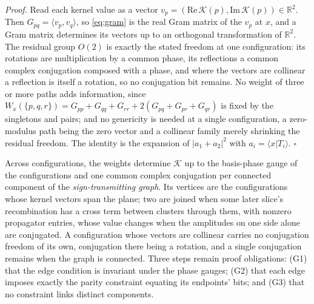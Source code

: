 \noindent\textit{Proof.} Read each kernel value as a vector $v_p = (\mathrm{Re}\,\mathcal{K}(p), \mathrm{Im}\,\mathcal{K}(p)) \in \mathbb{R}^2$. Then $G_{pq} = \langle v_p, v_q\rangle$, so \eqref{eq:gram} is the real Gram matrix of the $v_p$ at $x$, and a Gram matrix determines its vectors up to an orthogonal transformation of $\mathbb{R}^2$. The residual group $O(2)$ is exactly the stated freedom at one configuration: its rotations are multiplication by a common phase, its reflections a common complex conjugation composed with a phase, and where the vectors are collinear a reflection is itself a rotation, so no conjugation bit remains.  No weight of three or more paths adds information, since $W_x(\{p,q,r\}) = G_{pp} + G_{qq} + G_{rr} + 2(G_{pq} + G_{pr} + G_{qr})$ is fixed by the singletons and pairs; and no genericity is needed at a single configuration, a zero-modulus path being the zero vector and a collinear family merely shrinking the residual freedom.  The identity is the expansion of $|a_1 + a_2|^2$ with $a_i = \langle x|T_i\rangle$. \hfill$\square$


\begin{claim}\label{claim:global-polarization}
Across configurations, the weights determine $\mathcal{K}$ up to the basis-phase gauge of the configurations and one common complex conjugation per connected component of the \emph{sign-transmitting graph}. Its vertices are the configurations whose kernel vectors span the plane; two are joined when some later slice's recombination has a cross term between clusters through them, with nonzero propagator entries, whose value changes when the amplitudes on one side alone are conjugated. A configuration whose vectors are collinear carries no conjugation freedom of its own, conjugation there being a rotation, and a single conjugation remains when the graph is connected. Three steps remain proof obligations: (G1) that the edge condition is invariant under the phase gauges; (G2) that each edge imposes exactly the parity constraint equating its endpoints' bits; and (G3) that no constraint links distinct components.
\end{claim}

